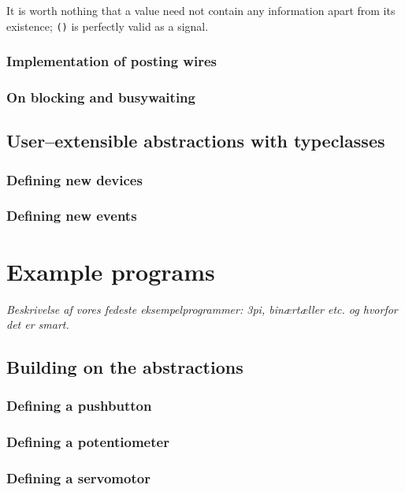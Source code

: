 \documentclass[a4paper, oneside, final]{memoir}
\begin{document}
It is worth nothing that a value need not contain any information
apart from its existence; \texttt{()} is perfectly valid as a signal.

\subsection{Implementation of posting wires}

\subsection{On blocking and busywaiting}

\section{User--extensible abstractions with typeclasses}

\subsection{Defining new devices}

\subsection{Defining new events}

\chapter{Example programs}

\textit{Beskrivelse af vores fedeste eksempelprogrammer: 3pi,
  binærtæller etc. og hvorfor det er smart.}

\section{Building on the abstractions}

\subsection{Defining a pushbutton}

\subsection{Defining a potentiometer}

\subsection{Defining a servomotor}
\end{document}
